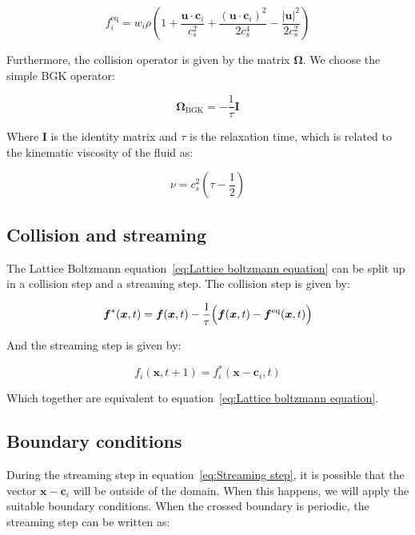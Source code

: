 \begin{equation}\label{eq:Equilibrium populations}
    f^{\text{eq}}_i = w_i \rho \left(1 + \frac{\bm{u} \cdot \bm{c}_i}{c_s^2} + \frac{{\left(\bm{u} \cdot \bm{c}_i\right)}^2}{2c_s^4} - \frac{|\bm{u}|^2}{2c_s^2}\right)
\end{equation}

Furthermore, the collision operator is given by the matrix $\bm{\Omega}$. We choose the simple BGK operator:

\begin{equation}\label{eq:Collision operator BGK}
    \bm{\Omega}_{\text{BGK}} = -\frac{1}{\tau}\bm{I}
\end{equation}

Where $\bm{I}$ is the identity matrix and $\tau$ is the relaxation time, which is related to the kinematic viscosity of the fluid as:

\begin{equation}\label{eq:Kinetmatic viscosity}
    \nu = c_s^2 \left(\tau - \frac{1}{2}\right)
\end{equation}

\subsection{Collision and streaming}\label{eq:Collision and streaming}
The Lattice Boltzmann equation~\ref{eq:Lattice boltzmann equation} can be split up in a collision step and a streaming step. The collision step is given by:

\begin{equation}\label{eq:Collision step}
    \bm{f}^*(\bm{x}, t) = \bm{f}(\bm{x}, t) - \frac{1}{\tau}\Bigl( \bm{f}(\bm{x}, t) - \bm{f}^{\text{eq}}(\bm{x}, t) \Bigr)
\end{equation}

And the streaming step is given by:

\begin{equation}\label{eq:Streaming step}
    f_i(\bm{x}, t+1) = f_i^*(\bm{x} - \bm{c}_i, t)
\end{equation}

Which together are equivalent to equation~\ref{eq:Lattice boltzmann equation}.

\subsection{Boundary conditions}\label{subsec:Boundary conditions}
During the streaming step in equation~\ref{eq:Streaming step}, it is possible that the vector $\bm{x} - \bm{c}_i$ will be outside of the domain. When this happens, we will apply the suitable boundary conditions. When the crossed boundary is periodic, the streaming step can be written as:

